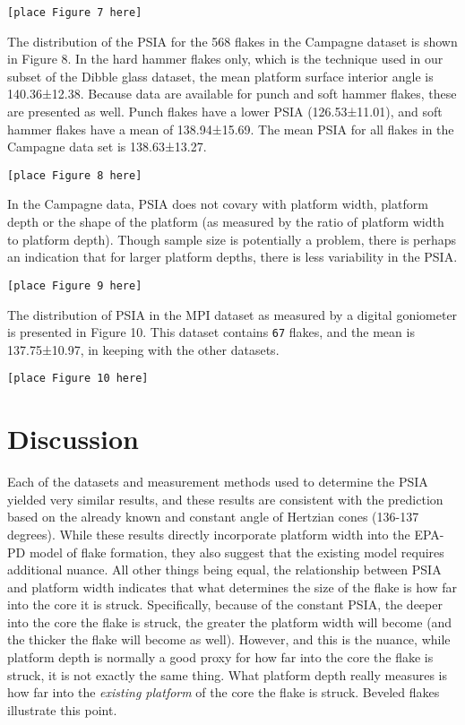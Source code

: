 \documentclass[10pt,letterpaper]{article}
\begin{document}
\begin{verbatim}
[place Figure 7 here]
\end{verbatim}

The distribution of the PSIA for the 568 flakes in the Campagne dataset
is shown in Figure 8. In the hard hammer flakes only, which is the
technique used in our subset of the Dibble glass dataset, the mean
platform surface interior angle is 140.36±12.38. Because data are
available for punch and soft hammer flakes, these are presented as well.
Punch flakes have a lower PSIA (126.53±11.01), and soft hammer flakes
have a mean of 138.94±15.69. The mean PSIA for all flakes in the
Campagne data set is 138.63±13.27.

\begin{verbatim}
[place Figure 8 here]
\end{verbatim}

In the Campagne data, PSIA does not covary with platform width, platform
depth or the shape of the platform (as measured by the ratio of platform
width to platform depth). Though sample size is potentially a problem,
there is perhaps an indication that for larger platform depths, there is
less variability in the PSIA.

\begin{verbatim}
[place Figure 9 here]
\end{verbatim}

The distribution of PSIA in the MPI dataset as measured by a digital
goniometer is presented in Figure 10. This dataset contains \texttt{67}
flakes, and the mean is 137.75±10.97, in keeping with the other
datasets.

\begin{verbatim}
[place Figure 10 here]
\end{verbatim}

\hypertarget{discussion}{%
\section{Discussion}\label{discussion}}

Each of the datasets and measurement methods used to determine the PSIA
yielded very similar results, and these results are consistent with the
prediction based on the already known and constant angle of Hertzian
cones (136-137 degrees). While these results directly incorporate
platform width into the EPA-PD model of flake formation, they also
suggest that the existing model requires additional nuance. All other
things being equal, the relationship between PSIA and platform width
indicates that what determines the size of the flake is how far into the
core it is struck. Specifically, because of the constant PSIA, the
deeper into the core the flake is struck, the greater the platform width
will become (and the thicker the flake will become as well). However,
and this is the nuance, while platform depth is normally a good proxy
for how far into the core the flake is struck, it is not exactly the
same thing. What platform depth really measures is how far into the
\emph{existing platform} of the core the flake is struck. Beveled flakes
illustrate this point.
\end{document}
